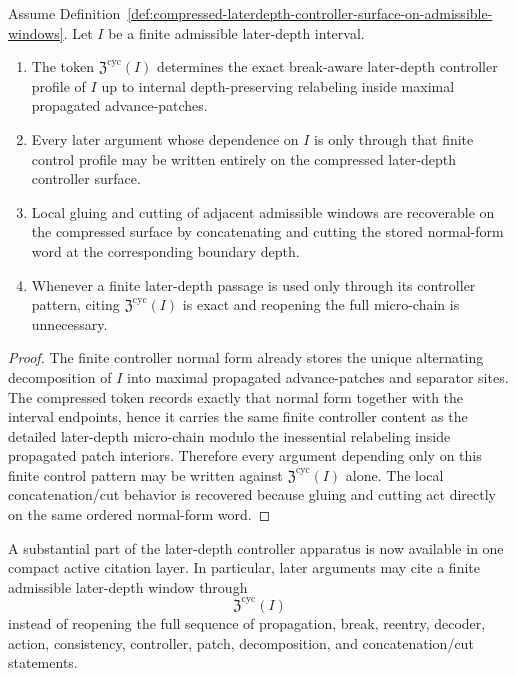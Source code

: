 \begin{proposition}
\label{prop:exact-finite-control-recovery-from-the-compressed-laterdepth-controller-surface}
Assume Definition~\ref{def:compressed-laterdepth-controller-surface-on-admissible-windows}. Let $I$ be a finite admissible later-depth interval.
\begin{enumerate}[leftmargin=2em,label=\textup{(\roman*)}]
  \item The token $\mathfrak Z^{\mathrm{cyc}}(I)$ determines the exact break-aware later-depth controller profile of $I$ up to internal depth-preserving relabeling inside maximal propagated advance-patches.
  \item Every later argument whose dependence on $I$ is only through that finite control profile may be written entirely on the compressed later-depth controller surface.
  \item Local gluing and cutting of adjacent admissible windows are recoverable on the compressed surface by concatenating and cutting the stored normal-form word at the corresponding boundary depth.
  \item Whenever a finite later-depth passage is used only through its controller pattern, citing $\mathfrak Z^{\mathrm{cyc}}(I)$ is exact and reopening the full micro-chain is unnecessary.
\end{enumerate}
\end{proposition}

\begin{proof}
The finite controller normal form already stores the unique alternating decomposition of $I$ into maximal propagated advance-patches and separator sites. The compressed token records exactly that normal form together with the interval endpoints, hence it carries the same finite controller content as the detailed later-depth micro-chain modulo the inessential relabeling inside propagated patch interiors. Therefore every argument depending only on this finite control pattern may be written against $\mathfrak Z^{\mathrm{cyc}}(I)$ alone. The local concatenation/cut behavior is recovered because gluing and cutting act directly on the same ordered normal-form word.
\end{proof}

\begin{corollary}
\label{cor:what-the-compressed-laterdepth-controller-surface-already-buys-on-the-active-line}
A substantial part of the later-depth controller apparatus is now available in one compact active citation layer. In particular, later arguments may cite a finite admissible later-depth window through
\[
\mathfrak Z^{\mathrm{cyc}}(I)
\]
instead of reopening the full sequence of propagation, break, reentry, decoder, action, consistency, controller, patch, decomposition, and concatenation/cut statements.
\end{corollary}

